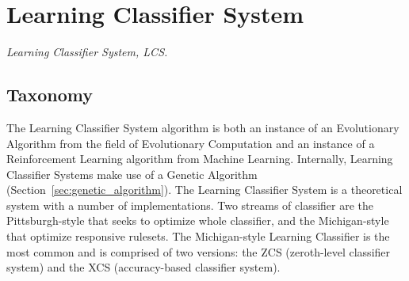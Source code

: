 

\section{Learning Classifier System} 
\label{sec:learning_classifier_system}

\emph{Learning Classifier System, LCS.}

\subsection{Taxonomy}
The Learning Classifier System algorithm is both an instance of an Evolutionary Algorithm from the field of Evolutionary Computation and an instance of a Reinforcement Learning algorithm from Machine Learning. Internally, Learning Classifier Systems make use of a Genetic Algorithm (Section~\ref{sec:genetic_algorithm}).
The Learning Classifier System is a theoretical system with a number of implementations. Two streams of classifier are the Pittsburgh-style that seeks to optimize whole classifier, and the Michigan-style that optimize responsive rulesets. 
The Michigan-style Learning Classifier is the most common and is comprised of two versions: the ZCS (zeroth-level classifier system) and the XCS (accuracy-based classifier system).

